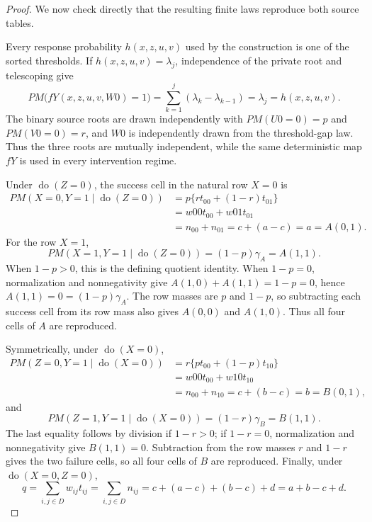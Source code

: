 \documentclass{article}
\begin{document}
\begin{proof}
We now check directly that the resulting finite laws reproduce both source tables.

Every response probability \(h(x,z,u,v)\) used by the construction is one of the sorted thresholds.  If \(h(x,z,u,v)=\lambda_j\), independence of the private root and telescoping give
\[
PM\bigl(fY(x,z,u,v,W0)=1\bigr)
=\sum_{k=1}^{j}(\lambda_k-\lambda_{k-1})
=\lambda_j
=h(x,z,u,v).
\]
The binary source roots are drawn independently with \(PM(U0=0)=p\) and \(PM(V0=0)=r\), and \(W0\) is independently drawn from the threshold-gap law.  Thus the three roots are mutually independent, while the same deterministic map \(fY\) is used in every intervention regime.

Under \(\operatorname{do}(Z=0)\), the success cell in the natural row \(X=0\) is
\[
\begin{aligned}
PM(X=0,Y=1\mid\operatorname{do}(Z=0))
&=p\{r t_{00}+(1-r)t_{01}\}\\
&=w00t_{00}+w01t_{01}\\
&=n_{00}+n_{01}=c+(a-c)=a=A(0,1).
\end{aligned}
\]
For the row \(X=1\),
\[
PM(X=1,Y=1\mid\operatorname{do}(Z=0))=(1-p)\gamma_A=A(1,1).
\]
When \(1-p>0\), this is the defining quotient identity.  When \(1-p=0\), normalization and nonnegativity give \(A(1,0)+A(1,1)=1-p=0\), hence \(A(1,1)=0=(1-p)\gamma_A\).  The row masses are \(p\) and \(1-p\), so subtracting each success cell from its row mass also gives \(A(0,0)\) and \(A(1,0)\).  Thus all four cells of \(A\) are reproduced.

Symmetrically, under \(\operatorname{do}(X=0)\),
\[
\begin{aligned}
PM(Z=0,Y=1\mid\operatorname{do}(X=0))
&=r\{p t_{00}+(1-p)t_{10}\}\\
&=w00t_{00}+w10t_{10}\\
&=n_{00}+n_{10}=c+(b-c)=b=B(0,1),
\end{aligned}
\]
and
\[
PM(Z=1,Y=1\mid\operatorname{do}(X=0))=(1-r)\gamma_B=B(1,1).
\]
The last equality follows by division if \(1-r>0\); if \(1-r=0\), normalization and nonnegativity give \(B(1,1)=0\).  Subtraction from the row masses \(r\) and \(1-r\) gives the two failure cells, so all four cells of \(B\) are reproduced.  Finally, under \(\operatorname{do}(X=0,Z=0)\),
\[
q=\sum_{i,j\in D}w_{ij}t_{ij}
=\sum_{i,j\in D}n_{ij}
=c+(a-c)+(b-c)+d
=a+b-c+d.
\]


\end{proof}
\end{document}
